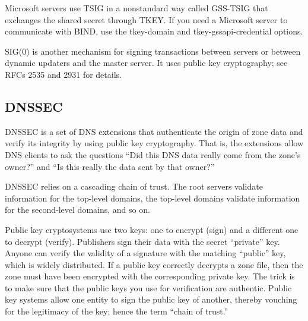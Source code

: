 Microsoft servers use TSIG in a nonstandard way called GSS-TSIG that
exchanges the shared secret through TKEY. If you need a Microsoft server
to communicate with BIND, use the {tkey-domain} and
{tkey-gssapi-credential} options.

SIG(0) is another mechanism for signing transactions between servers or
between dynamic updaters and the master server. It uses public key
cryptography; see RFCs 2535 and 2931 for details.

\protect\hypertarget{part0024_split_059.html}{}{}

\hypertarget{part0024_split_059.htmlux5cux23_idContainer1069}{}
\hypertarget{part0024_split_059.htmlux5cux23calibre_pb_58}{%
\subsection[DNSSEC]{\texorpdfstring{\protect\hypertarget{part0024_split_059.htmlux5cux23_idTextAnchor938}{}{}DNSSEC}{DNSSEC}}\label{part0024_split_059.htmlux5cux23calibre_pb_58}}

\protect\hypertarget{part0024_split_059.htmlux5cux23_idIndexMarker2248}{}{}\protect\hypertarget{part0024_split_059.htmlux5cux23_idIndexMarker2249}{}{}\protect\hypertarget{part0024_split_059.htmlux5cux23_idIndexMarker2250}{}{}DNSSEC
is a set of DNS extensions that authenticate the origin of zone data and
verify its integrity by using public key cryptography. That is, the
extensions allow DNS clients to ask the questions ``Did this DNS data
really come from the zone's owner?'' and ``Is this really the data sent
by that owner?''

DNSSEC relies on a cascading chain of trust. The root servers validate
information for the top-level domains, the top-level domains validate
information for the second-level domains, and so on.

\protect\hypertarget{part0024_split_059.htmlux5cux23_idIndexMarker2251}{}{}Public
key cryptosystems use two keys: one to encrypt (sign) and a different
one to decrypt (verify). Publishers sign their data with the secret
``private'' key. Anyone can verify the validity of a signature with the
matching ``public'' key, which is widely distributed. If a public key
correctly decrypts a zone file, then the zone must have been encrypted
with the corresponding private key. The trick is to make sure that the
public keys you use for verification are authentic. Public key systems
allow one entity to sign the public key of another, thereby vouching for
the legitimacy of the key; hence the term ``chain of trust.''

